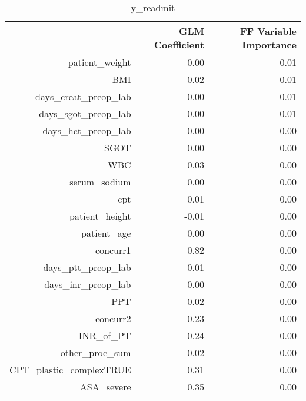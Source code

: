 \begin{table}[ht]
\centering
\begin{tabular}{rrr}
  \hline
 & GLM Coefficient & FF Variable Importance \\ 
  \hline
patient\_weight & 0.00 & 0.01 \\ 
  BMI & 0.02 & 0.01 \\ 
  days\_creat\_preop\_lab & -0.00 & 0.01 \\ 
  days\_sgot\_preop\_lab & -0.00 & 0.01 \\ 
  days\_hct\_preop\_lab & 0.00 & 0.00 \\ 
  SGOT & 0.00 & 0.00 \\ 
  WBC & 0.03 & 0.00 \\ 
  serum\_sodium & 0.00 & 0.00 \\ 
  cpt & 0.01 & 0.00 \\ 
  patient\_height & -0.01 & 0.00 \\ 
  patient\_age & 0.00 & 0.00 \\ 
  concurr1 & 0.82 & 0.00 \\ 
  days\_ptt\_preop\_lab & 0.01 & 0.00 \\ 
  days\_inr\_preop\_lab & -0.00 & 0.00 \\ 
  PPT & -0.02 & 0.00 \\ 
  concurr2 & -0.23 & 0.00 \\ 
  INR\_of\_PT & 0.24 & 0.00 \\ 
  other\_proc\_sum & 0.02 & 0.00 \\ 
  CPT\_plastic\_complexTRUE & 0.31 & 0.00 \\ 
  ASA\_severe & 0.35 & 0.00 \\ 
   \hline
\end{tabular}
\caption{y_readmit} 
\end{table}

